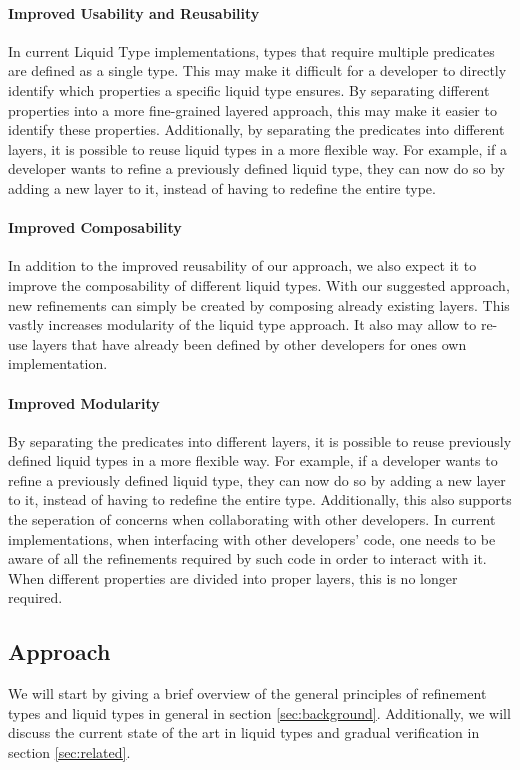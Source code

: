 \documentclass[acmsmall, review, screen]{acmart}
\begin{document}
\paragraph{Improved Usability and Reusability}

In current Liquid Type implementations, types that require multiple predicates are defined as a single type. This may make it difficult for a developer to directly identify which properties a specific liquid type ensures. By separating different properties into a more fine-grained layered approach, this may make it easier to identify these properties. Additionally, by separating the predicates into different layers, it is possible to reuse liquid types in a more flexible way. For example, if a developer wants to refine a previously defined liquid type, they can now do so by adding a new layer to it, instead of having to redefine the entire type.

\paragraph{Improved Composability}

In addition to the improved reusability of our approach, we also expect it to improve the composability of different liquid types. With our suggested approach, new refinements can simply be created by composing already existing layers. This vastly increases modularity of the liquid type approach. It also may allow to re-use layers that have already been defined by other developers for ones own implementation.

\paragraph{Improved Modularity}

By separating the predicates into different layers, it is possible to reuse previously defined liquid types in a more flexible way. For example, if a developer wants to refine a previously defined liquid type, they can now do so by adding a new layer to it, instead of having to redefine the entire type. Additionally, this also supports the seperation of concerns when collaborating with other developers. In current implementations, when interfacing with other developers' code, one needs to be aware of all the refinements required by such code in order to interact with it. When different properties are divided into proper layers, this is no longer required.

\subsection{Approach}
We will start by giving a brief overview of the general principles of refinement types and liquid types in general in section \ref{sec:background}. Additionally, we will discuss the current state of the art in liquid types and gradual verification in section \ref{sec:related}. 
\end{document}
